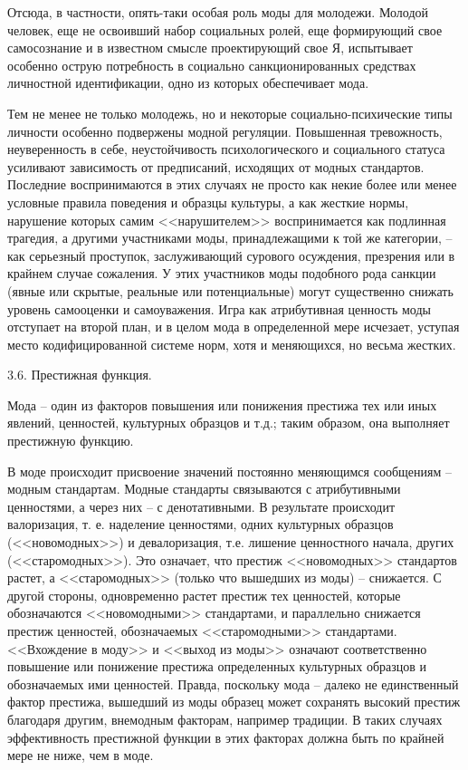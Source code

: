   Отсюда, в частности, опять-таки особая роль моды для молодежи. Молодой
  человек, еще не освоивший набор социальных ролей, еще формирующий свое
  самосознание и в известном смысле проектирующий свое Я, испытывает особенно
  острую потребность в социально санкционированных средствах личностной
  идентификации, одно из которых обеспечивает мода.
  
  Тем не менее не только молодежь, но и некоторые социально-психические типы
  личности особенно подвержены модной регуляции. Повышенная тревожность,
  неуверенность в себе, неустойчивость психологического и социального статуса
  усиливают зависимость от предписаний, исходящих от модных стандартов.
  Последние воспринимаются в этих случаях не просто как некие более или менее
  условные правила поведения и образцы культуры, а как жесткие нормы, нарушение
  которых самим <<нарушителем>> воспринимается как подлинная трагедия, а другими
  участниками моды, принадлежащими к той же категории, – как серьезный
  проступок, заслуживающий сурового осуждения, презрения или в крайнем случае
  сожаления. У этих участников моды подобного рода санкции (явные или скрытые,
  реальные или потенциальные) могут существенно снижать уровень самооценки и
  самоуважения. Игра как атрибутивная ценность моды отступает на второй план, и
  в целом мода в определенной мере исчезает, уступая место кодифицированной
  системе норм, хотя и меняющихся, но весьма жестких.
  
    3.6.  Престижная функция. 
  
  Мода – один из факторов повышения или понижения престижа тех или иных явлений,
  ценностей, культурных образцов и т.д.; таким образом, она выполняет престижную
  функцию.
  
  В моде происходит присвоение значений постоянно меняющимся сообщениям – модным
  стандартам. Модные стандарты связываются с атрибутивными ценностями, а через
  них – с денотативными. В результате происходит валоризация, т. е. наделение
  ценностями, одних культурных образцов (<<новомодных>>) и девалоризация, т.е.
  лишение ценностного начала, других (<<старомодных>>). Это означает, что
  престиж <<новомодных>> стандартов растет, а <<старомодных>> (только что
  вышедших из моды) – снижается. С другой стороны, одновременно растет престиж
  тех ценностей, которые обозначаются <<новомодными>> стандартами, и параллельно
  снижается престиж ценностей, обозначаемых <<старомодными>> стандартами.
  <<Вхождение в моду>> и <<выход из моды>> означают соответственно повышение или
  понижение престижа определенных культурных образцов и обозначаемых ими
  ценностей. Правда, поскольку мода – далеко не единственный фактор престижа,
  вышедший из моды образец может сохранять высокий престиж благодаря другим,
  внемодным факторам, например традиции. В таких случаях эффективность
  престижной функции в этих факторах должна быть по крайней мере не ниже, чем в
  моде.
  
